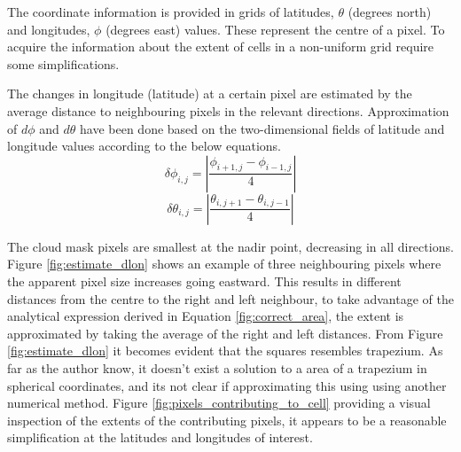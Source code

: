 The coordinate information is provided in grids of latitudes, $\theta$ (degrees north) and longitudes, $\phi$ (degrees east) values. These represent the centre of a pixel. To acquire the information about the extent of cells in a non-uniform grid require some simplifications. 

The changes in longitude (latitude) at a certain pixel are estimated by the average distance to neighbouring pixels in the relevant directions. Approximation of $d\phi$ and $d\theta$ have been done based on the two-dimensional fields of latitude and longitude values according to the below equations.%
\begin{equation} \label{eq:app_lon}
    \delta \phi_{i,j} = \left| \frac{\phi_{i+1,j} - \phi_{i-1, j}}{4} \right|
\end{equation}
\begin{equation} \label{eq:app_lat}
    \delta \theta_{i,j} = \left| \frac{\theta_{i,j+1} - \theta_{i, j-1}}{4} \right|
\end{equation}

The cloud mask pixels are smallest at the nadir point, decreasing in all directions.
Figure \ref{fig:estimate_dlon} shows an example of three neighbouring pixels where the apparent pixel size increases going eastward. This results in different distances from the centre to the right and left neighbour, to take advantage of the analytical expression derived in Equation \ref{fig:correct_area}, the extent is approximated by taking the average of the right and left distances. From Figure \ref{fig:estimate_dlon} it becomes evident that the squares resembles trapezium. As far as the author know, it doesn't exist a solution to a area of a trapezium in spherical coordinates, and its not clear if approximating this using using another numerical method. Figure \ref{fig:pixels_contributing_to_cell} providing a visual inspection of the extents of the contributing pixels, it appears to be a reasonable simplification at the latitudes and longitudes of interest. 

